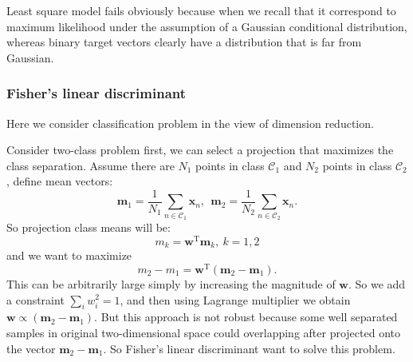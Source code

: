\documentclass[a4paper]{book}
\newcommand{\mrm}{\mathrm}
\newcommand{\mbf}{\mathbf}
\newcommand{\mcal}{\mathcal}
\newcommand{\ww}{\mbf w}
\newcommand{\mm}{\mbf m}
\newcommand{\xx}{\mbf x}
\newcommand{\trans}{^{\mrm T}}
\begin{document}
Least square model fails obviously because when we recall that it correspond to maximum likelihood under the assumption of a Gaussian conditional distribution, whereas binary target vectors clearly have a distribution that is far from Gaussian.
\subsubsection*{Fisher's linear discriminant}
Here we consider classification problem in the view of dimension reduction.

Consider two-class problem first, we can select a projection that maximizes the class separation. Assume there are $N_1$ points in class $\mcal C_1$ and $N_2$ points in class $\mcal C_2$, define mean vectors:
\begin{equation}\label{}
  \mm_1=\frac1{N_1}\sum_{n\in\mcal C_1}\xx_n, \ \ \mm_2 = \frac{1}{N_2}\sum_{n\in\mcal C_2}\xx_n.
\end{equation}
So projection class means will be:
\begin{equation}\label{}
  m_k=\ww\trans\mm_k,\ k=1,2
\end{equation}
and we want to maximize
\begin{equation}\label{}
  m_2-m_1=\ww\trans(\mm_2-\mm_1).
\end{equation}
This can be arbitrarily large simply by increasing the magnitude of $\ww$. So we add a constraint $\sum_iw_i^2=1$, and then using Lagrange multiplier we obtain $\ww\propto(\mm_2-\mm_1)$. But this approach is not robust because some well separated samples in original two-dimensional space could overlapping after projected onto the vector $\mm_2-\mm_1$. So Fisher's linear discriminant want to solve this problem.
\end{document}
